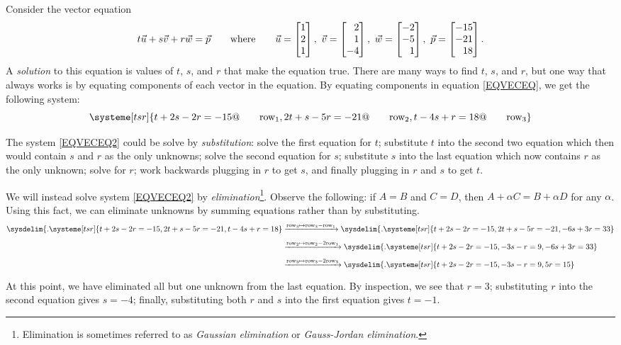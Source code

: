 	Consider the vector equation
	\begin{equation}\label{EQVECEQ}
		t\vec u+s\vec v+r\vec w = \vec p\qquad\text{where}\qquad \vec u=\mat{1\\2\\1},\ 
		\vec v=\mat{2\\1\\-4},\ \vec w=\mat{-2\\-5\\1},\ \vec p=\mat{-15\\-21\\18}.
	\end{equation}
	A \emph{solution} to this equation is values of $t$, $s$, and $r$ that make the equation true.
	There are many ways to find $t$, $s$, and $r$, but one way that always works is by
	equating components of each vector in the equation. By equating components in equation
	\eqref{EQVECEQ}, we get the following system:
	\begin{equation}
		\label{EQVECEQ2}
		\systeme[tsr]{
			t+2s-2r=-15@\qquad\text{row}_1,
			2t+s-5r=-21@\qquad\text{row}_2,
			t-4s+r=18@\qquad\text{row}_3
		}
	\end{equation}

	The system \eqref{EQVECEQ2} could be solve by \emph{substitution}:
	solve the first equation for $t$; substitute $t$ into the second two equation
	which then would contain $s$ and $r$ as the only unknowns; solve the second
	equation for $s$; substitute $s$ into the last equation which now contains
	$r$ as the only unknown; solve for $r$; work backwards plugging in $r$ to get $s$,
	and finally plugging in $r$ and $s$ to get $t$.

	We will instead solve system \eqref{EQVECEQ2} by \emph{elimination}\footnote{
	Elimination is sometimes referred to as \emph{Gaussian elimination}
	or \emph{Gauss-Jordan elimination}.}.  Observe the following: if $A=B$ and
	$C=D$, then $A+ \alpha C=B+\alpha D$ for any $\alpha$.
	Using this fact, we can eliminate unknowns by summing equations rather than by
	substituting.
	\begin{align*}
	\sysdelim\{.
		\systeme[tsr]{
			t+2s-2r=-15,
			2t+s-5r=-21,
			t-4s+r=18
		}
		&\xrightarrow{\text{row}_3\mapsto\text{row}_3-\text{row}_1}
	\sysdelim\{.
		\systeme[tsr]{
			t+2s-2r=-15,
			2t+s-5r=-21,
			-6s+3r=33
		}\\[4pt]
		&\xrightarrow{\text{row}_2\mapsto\text{row}_2-2\text{row}_1}
	\sysdelim\{.
		\systeme[tsr]{
			t+2s-2r=-15,
			-3s-r=9,
			-6s+3r=33
		}\\[4pt]
		&\xrightarrow{\text{row}_3\mapsto\text{row}_3-2\text{row}_3}
	\sysdelim\{.
		\systeme[tsr]{
			t+2s-2r=-15,
			-3s-r=9,
			  5r=15
		}\\[4pt]
	\end{align*}
	At this point, we have eliminated all but one unknown from
	the last equation. By inspection, we see that $r=3$; substituting 
	$r$ into the second equation gives $s=-4$; finally, substituting both
	$r$ and $s$ into the first equation gives $t=-1$.

